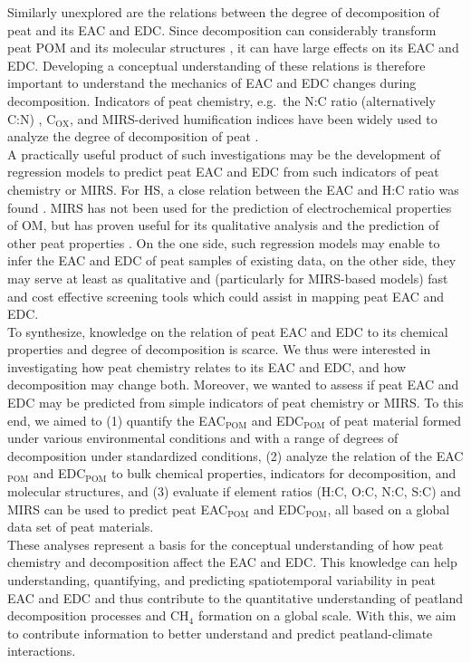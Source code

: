 \documentclass[alpha-refs, lineno]{wiley-article-rmd}
\begin{document}
Similarly unexplored are the relations between the degree of decomposition of peat and its EAC and EDC. Since decomposition can considerably transform peat POM and its molecular structures \autocite{Cocozza.2003}, it can have large effects on its EAC and EDC. Developing a conceptual understanding of these relations is therefore important to understand the mechanics of EAC and EDC changes during decomposition. Indicators of peat chemistry, e.g.~the N:C ratio (alternatively C:N) \autocite{Biester.2014}, C\(_\text{OX}\), and MIRS-derived humification indices \autocite{Broder.2012} have been widely used to analyze the degree of decomposition of peat \autocite{Biester.2014,Drollinger.2020}.\\
A practically useful product of such investigations may be the development of regression models to predict peat EAC and EDC from such indicators of peat chemistry or MIRS. For HS, a close relation between the EAC and H:C ratio was found \autocite{Aeschbacher.2010,Tan.2017}. MIRS has not been used for the prediction of electrochemical properties of OM, but has proven useful for its qualitative analysis \autocite{HernandezMontoya.2012,Yuan.2018} and the prediction of other peat properties \autocite{Hodgkins.2018,Artz.2008}.
On the one side, such regression models may enable to infer the EAC and EDC of peat samples of existing data, on the other side, they may serve at least as qualitative and (particularly for MIRS-based models) fast and cost effective screening tools which could assist in mapping peat EAC and EDC.\\
To synthesize, knowledge on the relation of peat EAC and EDC to its chemical properties and degree of decomposition is scarce. We thus were interested in investigating how peat chemistry relates to its EAC and EDC, and how decomposition may change both. Moreover, we wanted to assess if peat EAC and EDC may be predicted from simple indicators of peat chemistry or MIRS.
To this end, we aimed to (1) quantify the EAC\(_\text{POM}\) and EDC\(_\text{POM}\) of peat material formed under various environmental conditions and with a range of degrees of decomposition under standardized conditions, (2) analyze the relation of the EAC\(_\text{POM}\) and EDC\(_\text{POM}\) to bulk chemical properties, indicators for decomposition, and molecular structures, and (3) evaluate if element ratios (H:C, O:C, N:C, S:C) and MIRS can be used to predict peat EAC\(_\text{POM}\) and EDC\(_\text{POM}\), all based on a global data set of peat materials.\\
These analyses represent a basis for the conceptual understanding of how peat chemistry and decomposition affect the EAC and EDC. This knowledge can help understanding, quantifying, and predicting spatiotemporal variability in peat EAC and EDC and thus contribute to the quantitative understanding of peatland decomposition processes and CH\(_4\) formation on a global scale. With this, we aim to contribute information to better understand and predict peatland-climate interactions.
\end{document}
